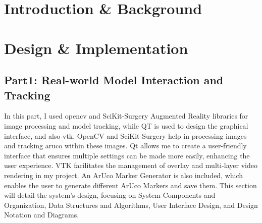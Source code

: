 \documentclass[12pt]{article}
\begin{document}
\section{Introduction \& Background}

 

\section{Design \& Implementation}

\subsection{Part1: Real-world Model Interaction and Tracking}

In this part, I used \gls{opencv}\cite{opencv_library} and SciKit-Surgery Augmented Reality\cite{Thompson_SciKit-Surgery_Compact_Libraries_2020} libraries for image
processing and  model tracking, while \gls{QT}\cite{QtWebsite} is used to design the graphical interface, and also \gls{vtk}\cite{vtkBook}. OpenCV and SciKit-Surgery help in processing images
and tracking \gls{aruco}\cite{1467495} within these images. Qt allows me to create a user-friendly interface that ensures multiple settings can be made more easily, enhancing the user experience. 
VTK facilitates the management of overlay and multi-layer video rendering in my project.
An ArUco Marker Generator is also included, which enables the user to generate different ArUco Markers and save them.
This section will detail the system's design, focusing on System Components and Organization, Data Structures and Algorithms,
User Interface Design, and Design Notation and Diagrams.
\end{document}
